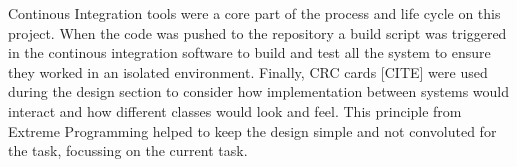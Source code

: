 Continous Integration tools were a core part of the process and life cycle on this project. When the code was pushed to the repository a build script was triggered in the continous integration software to build and test all the system to ensure they worked in an isolated environment. Finally, CRC cards [CITE] were used during the design section to consider how implementation between systems would interact and how different classes would look and feel. This principle from Extreme Programming helped to keep the design simple and not convoluted for the task, focussing on the current task.